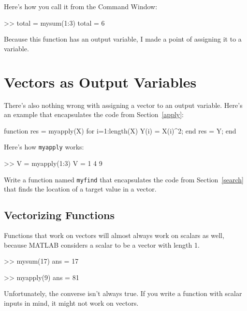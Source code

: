 
Here's how you call it from the Command Window:

\begin{code}
>> total = mysum(1:3)
total = 6
\end{code}

Because this function has an output variable, I made a
point of assigning it to a variable.



\section{Vectors as Output Variables}

There's also nothing wrong with assigning a vector to an output
variable. Here's an example that encapsulates the code from
Section~\ref{apply}:

\begin{code}
function res = myapply(X)
    for i=1:length(X)
        Y(i) = X(i)^2;
    end
    res = Y;
end
\end{code}

Here's how {\tt myapply} works:

\begin{code}
>> V = myapply(1:3)
V = 1     4     9
\end{code}

\begin{ex}
Write a function named {\tt myfind} that
encapsulates the code from Section~\ref{search} that finds the
location of a target value in a vector.
\end{ex}


\subsection{Vectorizing Functions}

Functions that work on vectors will almost always work on scalars
as well, because MATLAB considers a scalar to be a vector with
length 1.


\begin{code}
>> mysum(17)
ans = 17

>> myapply(9)
ans = 81
\end{code}

Unfortunately, the converse isn't always true.  If you write
a function with scalar inputs in mind, it might not work on vectors.

